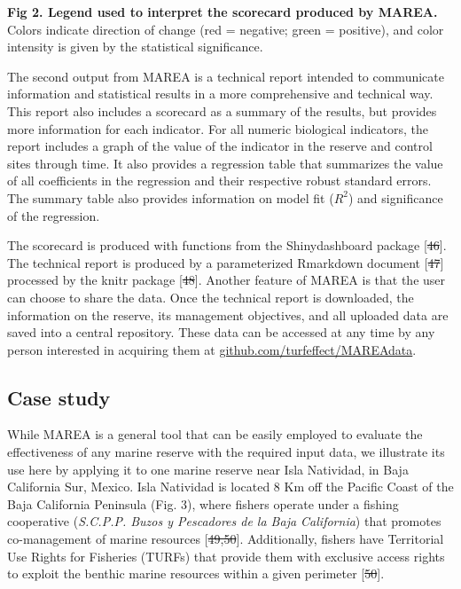 \documentclass[12pt,]{article}
\providecommand{\DIFaddtex}[1]{{\protect\color{blue}\uwave{#1}}} %
\providecommand{\DIFdeltex}[1]{{\protect\color{red}\sout{#1}}}                      %
\providecommand{\DIFaddbegin}{} %
\providecommand{\DIFaddend}{} %
\providecommand{\DIFdelbegin}{} %
\providecommand{\DIFdelend}{} %
\providecommand{\DIFadd}[1]{\texorpdfstring{\DIFaddtex{#1}}{#1}} %
\providecommand{\DIFdel}[1]{\texorpdfstring{\DIFdeltex{#1}}{}} %
\newcommand{\DIFscaledelfig}{0.5}
\newlength{\DIFdelgraphicswidth} %
\newlength{\DIFdelgraphicsheight} %
\newcommand{\DIFaddincludegraphics}[2][]{{\color{blue}\fbox{\DIFOincludegraphics[#1]{#2}}}} %
\newcommand{\DIFdelincludegraphics}[2][]{%
\sbox{\DIFdelgraphicsbox}{\DIFOincludegraphics[#1]{#2}}%
\settoboxwidth{\DIFdelgraphicswidth}{\DIFdelgraphicsbox} %
\settoboxtotalheight{\DIFdelgraphicsheight}{\DIFdelgraphicsbox} %
\scalebox{\DIFscaledelfig}{%
\parbox[b]{\DIFdelgraphicswidth}{\usebox{\DIFdelgraphicsbox}\\[-\baselineskip] \rule{\DIFdelgraphicswidth}{0em}}\llap{\resizebox{\DIFdelgraphicswidth}{\DIFdelgraphicsheight}{%
\setlength{\unitlength}{\DIFdelgraphicswidth}%
\begin{picture}(1,1)%
\thicklines\linethickness{2pt} %
{\color[rgb]{1,0,0}\put(0,0){\framebox(1,1){}}}%
{\color[rgb]{1,0,0}\put(0,0){\line( 1,1){1}}}%
{\color[rgb]{1,0,0}\put(0,1){\line(1,-1){1}}}%
\end{picture}%
}\hspace*{3pt}}} %
} %
\DeclareRobustCommand{\DIFaddbegin}{\DIFOaddbegin \let\includegraphics\DIFaddincludegraphics} %
\DeclareRobustCommand{\DIFaddend}{\DIFOaddend \let\includegraphics\DIFOincludegraphics} %
\DeclareRobustCommand{\DIFdelbegin}{\DIFOdelbegin \let\includegraphics\DIFdelincludegraphics} %
\DeclareRobustCommand{\DIFdelend}{\DIFOaddend \let\includegraphics\DIFOincludegraphics} %
\begin{document}
\textbf{Fig 2. Legend used to interpret the scorecard produced by
MAREA.} Colors indicate direction of change (red = negative; green =
positive), and color intensity is given by the statistical significance.

The second output from MAREA is a technical report intended to
communicate information and statistical results in a more comprehensive
and technical way. This report also includes a scorecard as a summary of
the results, but provides more information for each indicator. For all
numeric biological indicators, the report includes a graph of the value
of the indicator in the reserve and control sites through time. It also
provides a regression table that summarizes the value of all
coefficients in the regression and their respective robust standard
errors. The summary table also provides information on model fit
(\(R^2\)) and significance of the regression.

The scorecard is produced with functions from the Shinydashboard package
{[}\DIFdelbegin \DIFdel{46}\DIFdelend \DIFaddbegin \DIFadd{53}\DIFaddend {]}. The technical report is produced by a parameterized Rmarkdown
document {[}\DIFdelbegin \DIFdel{47}\DIFdelend \DIFaddbegin \DIFadd{54}\DIFaddend {]} processed by the knitr package {[}\DIFdelbegin \DIFdel{48}\DIFdelend \DIFaddbegin \DIFadd{55}\DIFaddend {]}. Another
feature of MAREA is that the user can choose to share the data. Once the
technical report is downloaded, the information on the reserve, its
management objectives, and all uploaded data are saved into a central
repository. These data can be accessed at any time by any person
interested in acquiring them at \url{github.com/turfeffect/MAREAdata}.

\subsection{Case study}\label{case-study}

While MAREA is a general tool that can be easily employed to evaluate
the effectiveness of any marine reserve with the required input data, we
illustrate its use here by applying it to one marine reserve near Isla
Natividad, in Baja California Sur, Mexico. Isla Natividad is located 8
Km off the Pacific Coast of the Baja California Peninsula (Fig. 3),
where fishers operate under a fishing cooperative (\emph{S.C.P.P. Buzos
y Pescadores de la Baja California}) that promotes co-management of
marine resources {[}\DIFdelbegin \DIFdel{49,50}\DIFdelend \DIFaddbegin \DIFadd{56,57}\DIFaddend {]}. Additionally, fishers have Territorial Use
Rights for Fisheries (TURFs) that provide them with exclusive access
rights to exploit the benthic marine resources within a given perimeter
{[}\DIFdelbegin \DIFdel{50}\DIFdelend \DIFaddbegin \DIFadd{57}\DIFaddend {]}.
\end{document}
